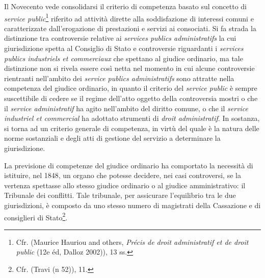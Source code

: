 \documentclass[12pt,it,a4paper,]{report}
\begin{document}
Il Novecento vede consolidarsi il criterio di competenza basato sul
concetto di \emph{service public}\footnote{Cfr. (Maurice Hauriou and
  others, \emph{Précis de droit administratif et de droit public} (12e
  éd, Dalloz 2002)), 13 ss.} riferito ad attività dirette alla
soddisfazione di interessi comuni e caratterizzate dall'erogazione di
prestazioni e servizi ai consociati. Si fa strada la distinzione tra
controversie relative ai \emph{services publics administratifs} la cui
giurisdizione spetta al Consiglio di Stato e controversie riguardanti i
\emph{services publics industriels et commerciaux} che spettano al
giudice ordinario, ma tale distinzione non si rivela essere così netta
nel momento in cui alcune controversie rientranti nell'ambito dei
\emph{service publics administratifs} sono attratte nella competenza del
giudice ordinario, in quanto il criterio del \emph{service public} è
sempre suscettibile di cedere se il regime dell'atto oggetto della
controversia mostri o che il \emph{service administratif} ha agito
nell'ambito del diritto comune, o che il \emph{service industriel et
commercial} ha adottato strumenti di \emph{droit administratif}. In
sostanza, si torna ad un criterio generale di competenza, in virtù del
quale è la natura delle norme sostanziali e degli atti di gestione del
servizio a determinare la giurisdizione.

La previsione di competenze del giudice ordinario ha comportato la
necessità di istituire, nel 1848, un organo che potesse decidere, nei
casi controversi, se la vertenza spettasse allo stesso giudice ordinario
o al giudice amministrativo: il Tribunale dei conflitti. Tale tribunale,
per assicurare l'equilibrio tra le due giurisdizioni, è composto da uno
stesso numero di magistrati della Cassazione e di consiglieri di
Stato\footnote{Cfr. (Travi (n 52)), 11.}.
\end{document}
